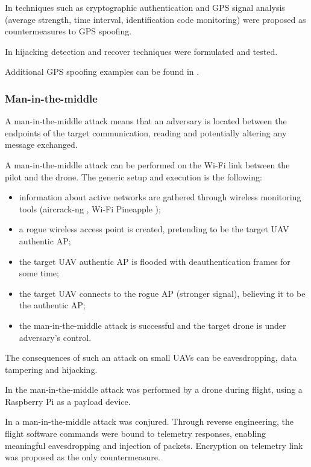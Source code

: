 \documentclass[journal]{IEEEtran}
\begin{document}
In \cite{anatomyspoofing} techniques such as cryptographic authentication and GPS signal analysis (average strength, time interval, identification code monitoring) were proposed as countermeasures to GPS spoofing.

In \cite{gpshijackingdetection} \cite{encryptedchannel} hijacking detection and recover techniques were formulated and tested.

Additional GPS spoofing examples can be found in \cite{publicsafetynetworksecurity} \cite{smartcitiesdronesecurity}.

\subsubsection{Man-in-the-middle}
A man-in-the-middle attack means that an adversary is located between the endpoints of the target communication, reading and potentially altering any message exchanged.

A man-in-the-middle attack can be performed on the Wi-Fi link between the pilot and the drone. The generic setup and execution is the following:
\begin{itemize}
\item information about active networks are gathered through wireless monitoring tools (aircrack-ng \cite{aircrackng}, Wi-Fi Pineapple \cite{wifipineapple});
\item a rogue wireless access point is created, pretending to be the target UAV authentic AP;
\item the target UAV authentic AP is flooded with deauthentication frames for some time;
\item the target UAV connects to the rogue AP (stronger signal), believing it to be the authentic AP;
\item the man-in-the-middle attack is successful and the target drone is under adversary's control.
\end{itemize}

The consequences of such an attack on small UAVs can be eavesdropping, data tampering and hijacking.

In \cite{accessvulnerabilities} the man-in-the-middle attack was performed by a drone during flight, using a Raspberry Pi \cite{raspberrypi} as a payload device.

In \cite{exploringuavvulnerabilities} a man-in-the-middle attack was conjured. Through reverse engineering, the flight software commands were bound to telemetry responses, enabling meaningful eavesdropping and injection of packets. Encryption on telemetry link was proposed as the only countermeasure.
\end{document}
